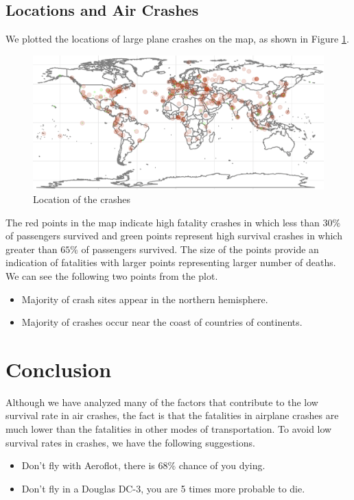\documentclass[12pt]{article}
\begin{document}
\subsection{Locations and Air Crashes}
We plotted the locations of large plane crashes on the map, as shown in Figure \ref{fig:maps}. \begin{figure}[htp]
    \centering
    \caption{Location of the crashes}
    \label{fig:maps}
    \includegraphics[width=.95\textwidth]{map-1.png}
\end{figure}
The red points in the map indicate high fatality crashes in which less than $30\%$ of passengers survived and green points represent high survival crashes in which greater than $65\%$ of passengers survived. The size of the points provide an indication of fatalities with larger points representing larger number of deaths. We can see the following two points from the plot. 
\begin{itemize}
    \item Majority of crash sites appear in the northern hemisphere. 
    \item Majority of crashes occur near the coast of countries of continents. 
\end{itemize}
\section{Conclusion}
Although we have analyzed many of the factors that contribute to the low survival rate in air crashes, the fact is that the fatalities in airplane crashes are much lower than the fatalities in other modes of transportation. 
To avoid low survival rates in crashes, we have the following suggestions.
\begin{itemize}
    \item Don't fly with Aeroflot, there is $68\%$ chance of you dying. 
    \item Don't fly in a Douglas DC-3, you are 5 times more probable to die. 
\end{itemize}
\end{document}
